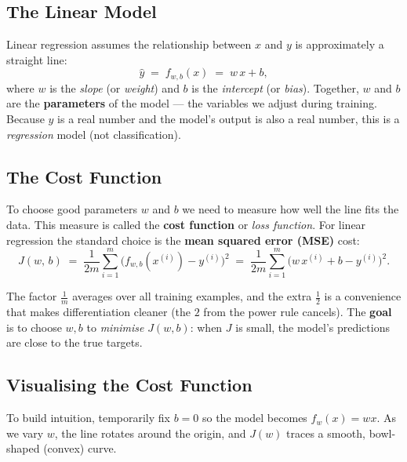 \subsection{The Linear Model}

Linear regression assumes the relationship between $x$ and $y$ is
approximately a straight line:
\begin{equation}
\hat{y} \;=\; f_{w,b}(x) \;=\; w\,x + b,
\label{eq:linmodel}
\end{equation}
where $w$ is the \emph{slope} (or \emph{weight}) and $b$ is the
\emph{intercept} (or \emph{bias}). Together, $w$ and $b$ are the
\textbf{parameters} of the model — the variables we adjust during training.
Because $y$ is a real number and the model's output is also a real number, this
is a \emph{regression} model (not classification).

\subsection{The Cost Function}

To choose good parameters $w$ and $b$ we need to measure how well the line
fits the data. This measure is called the \textbf{cost function} or
\emph{loss function}. For linear regression the standard choice is the
\textbf{mean squared error (MSE)} cost:
\begin{equation}
J(w,\,b) \;=\; \frac{1}{2m}\sum_{i=1}^{m}
\bigl(f_{w,b}(x^{(i)}) - y^{(i)}\bigr)^2
\;=\; \frac{1}{2m}\sum_{i=1}^{m}
\bigl(w\,x^{(i)} + b - y^{(i)}\bigr)^2.
\label{eq:mse-cost}
\end{equation}

The factor $\tfrac{1}{m}$ averages over all training examples, and the extra
$\tfrac{1}{2}$ is a convenience that makes differentiation cleaner (the $2$
from the power rule cancels). The \textbf{goal} is to choose $w,b$ to
\emph{minimise} $J(w,b)$: when $J$ is small, the model's predictions are
close to the true targets.

\subsection{Visualising the Cost Function}

To build intuition, temporarily fix $b=0$ so the model becomes
$f_w(x)=wx$. As we vary $w$, the line rotates around the origin, and
$J(w)$ traces a smooth, bowl-shaped (convex) curve.


